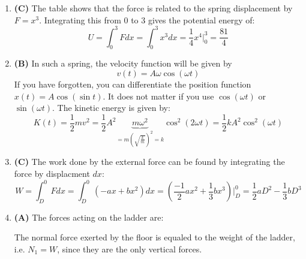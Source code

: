 \documentclass{../../oss-handout}
\begin{document}
\begin{enumerate}[leftmargin=17pt]
\item\textbf{(C)} The table shows that the force is related to the spring
  displacement by $F=x^3$. Integrating this from 0 to 3 gives the potential
  energy of:
  \begin{displaymath}
    U=\int_0^3 Fdx=\int_0^3 x^3dx = \frac14x^4\Biggr|^3_0 = \frac{81}4
  \end{displaymath}

\item\textbf{(B)} In such a spring, the velocity function will be given by
  \begin{displaymath}
    v(t)= A\omega\cos(\omega t)
  \end{displaymath}
  If you have forgotten, you can differentiate the position function
  $x(t)=A\cos(\sin t)$. It does not matter if you use $\cos(\omega t)$ or
  $\sin(\omega t)$. The kinetic energy is given by:
  \begin{displaymath}
    K(t)=\frac12mv^2=\frac12{A^2}
    \underbrace{m\omega^2}_{=m\left(\sqrt{\frac km}\right)^2=k}
    \cos^2(2\omega t)=\boxed{\frac12kA^2\cos^2(\omega t)}
  \end{displaymath}

\item\textbf{(C)} The work done by the external force can be found by
  integrating the force by displacment $dx$:
  \begin{displaymath}
    W= \int_D^0 Fdx = \int_D^0 (-ax+bx^2)dx
    =\left(\frac{-1}2ax^2+\frac13bx^3\right)\Biggr|^0_D
    =\boxed{\frac12aD^2-\frac13bD^3}
  \end{displaymath}
  \newpage
  
\item\textbf{(A)} The forces acting on the ladder are:
  \begin{center}
  \end{center}
  The normal force exerted by the floor is equaled to the weight of the ladder,
  i.e. $N_1=W$, since they are the only vertical forces.
  

\end{enumerate}
\end{document}

